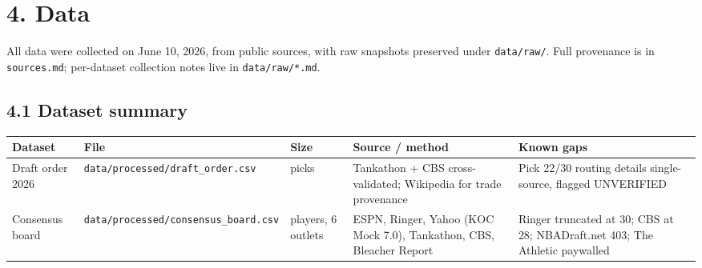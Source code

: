 \documentclass[
  10pt,
]{article}
\newcounter{none} %
\begin{document}
\section{4. Data}\label{data}

All data were collected on June 10, 2026, from public sources, with raw
snapshots preserved under \texttt{data/raw/}. Full provenance is in
\texttt{sources.md}; per-dataset collection notes live in
\texttt{data/raw/*.md}.

\subsection{4.1 Dataset summary}\label{dataset-summary}

{\def\LTcaptype{none} %
\begin{longtable}[]{@{}
  >{\raggedright\arraybackslash}p{}
  >{\raggedright\arraybackslash}p{}
  >{\raggedright\arraybackslash}p{}
  >{\raggedright\arraybackslash}p{}
  >{\raggedright\arraybackslash}p{}@{}}
\toprule\noalign{}
\begin{minipage}[b]{\linewidth}\raggedright
Dataset
\end{minipage} & \begin{minipage}[b]{\linewidth}\raggedright
File
\end{minipage} & \begin{minipage}[b]{\linewidth}\raggedright
Size
\end{minipage} & \begin{minipage}[b]{\linewidth}\raggedright
Source / method
\end{minipage} & \begin{minipage}[b]{\linewidth}\raggedright
Known gaps
\end{minipage} \\
\midrule\noalign{}
\endhead
\bottomrule\noalign{}
\endlastfoot
Draft order 2026 & \texttt{data/processed/draft\_order.csv} & 30 picks &
Tankathon + CBS cross-validated; Wikipedia for trade provenance & Pick 22/30
routing details single-source, flagged UNVERIFIED \\
Consensus board & \texttt{data/processed/consensus\_board.csv} & 45 players, 6
outlets & ESPN, Ringer, Yahoo (KOC Mock 7.0), Tankathon, CBS, Bleacher Report &
Ringer truncated at 30; CBS at 28; NBADraft.net 403; The Athletic paywalled \\

\end{longtable}}
\end{document}
